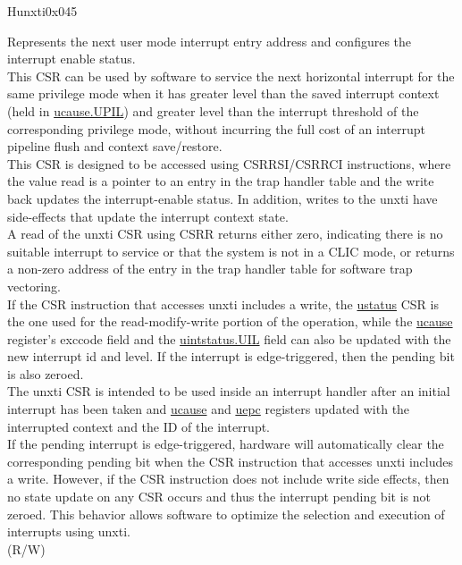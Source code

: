 \begin{register}{H}{unxti}{0x045}\label{regdesc:UNXTI_REG}
%
\regnewline%
\begin{regdesc}\begin{reglist}
\label{fielddesc:UNXTI}\item [UNXTI]
Represents the next user mode interrupt entry address and configures the interrupt enable status.\\
This CSR can be used by software to service the next horizontal interrupt for the same privilege mode when it has greater level than the saved interrupt context (held in \hyperref[fielddesc:UCAUSE_UPIL]{{ucause.UPIL}}) and greater level than the interrupt threshold of the corresponding privilege mode, without incurring the full cost of an interrupt pipeline flush and context save/restore.\\
This CSR is designed to be accessed using CSRRSI/CSRRCI instructions, where the value read is a pointer to an entry in the trap handler table and the write back updates the interrupt-enable status. In addition, writes to the unxti have side-effects that update the interrupt context state.\\
A read of the unxti CSR using CSRR returns either zero, indicating there is no suitable interrupt to service or that the system is not in a CLIC mode, or returns a non-zero address of the entry in the trap handler table for software trap vectoring.\\
If the CSR instruction that accesses unxti includes a write, the \hyperref[regdesc:USTATUS]{ustatus} CSR is the one used for the read-modify-write portion of the operation, while the \hyperref[regdesc:UCAUSE]{ucause} register’s exccode field and the \hyperref[fielddesc:UINTSTATUS_UIL]{uintstatus.UIL} field can also be updated with the new interrupt id and level. If the interrupt is edge-triggered, then the pending bit is also zeroed.\\
The unxti CSR is intended to be used inside an interrupt handler after an initial interrupt has been taken and \hyperref[regdesc:UCAUSE]{ucause} and \hyperref[regdesc:UEPC]{uepc} registers updated with the interrupted context and the ID of the interrupt. \\
If the pending interrupt is edge-triggered, hardware will automatically clear the corresponding pending bit when the CSR instruction that accesses unxti includes a write. However, if the CSR instruction does not include write side effects, then no state update on any CSR occurs and thus the interrupt pending bit is not zeroed. This behavior allows software to optimize the selection and execution of interrupts using unxti.\\
(R/W)
\end{reglist}\end{regdesc}
\end{register}

